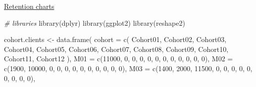 \documentclass[
]{book}
\newenvironment{Shaded}{\begin{snugshade}}{\end{snugshade}}
\newcommand{\AttributeTok}[1]{\textcolor[rgb]{0.77,0.63,0.00}{#1}}
\newcommand{\CommentTok}[1]{\textcolor[rgb]{0.56,0.35,0.01}{\textit{#1}}}
\newcommand{\DecValTok}[1]{\textcolor[rgb]{0.00,0.00,0.81}{#1}}
\newcommand{\FunctionTok}[1]{\textcolor[rgb]{0.00,0.00,0.00}{#1}}
\newcommand{\NormalTok}[1]{#1}
\newcommand{\OtherTok}[1]{\textcolor[rgb]{0.56,0.35,0.01}{#1}}
\newcommand{\StringTok}[1]{\textcolor[rgb]{0.31,0.60,0.02}{#1}}
\begin{document}
\href{https://www.analyzecore.com/2014/07/03/cohort-analysis-in-r-retention-charts/}{Retention charts}

\begin{Shaded}
\begin{Highlighting}[]
\CommentTok{\# libraries}
\FunctionTok{library}\NormalTok{(dplyr)}
\FunctionTok{library}\NormalTok{(ggplot2)}
\FunctionTok{library}\NormalTok{(reshape2)}

\NormalTok{cohort.clients }\OtherTok{\textless{}{-}} \FunctionTok{data.frame}\NormalTok{(}
    \AttributeTok{cohort =} \FunctionTok{c}\NormalTok{(}
        \StringTok{\textquotesingle{}Cohort01\textquotesingle{}}\NormalTok{,}
        \StringTok{\textquotesingle{}Cohort02\textquotesingle{}}\NormalTok{,}
        \StringTok{\textquotesingle{}Cohort03\textquotesingle{}}\NormalTok{,}
        \StringTok{\textquotesingle{}Cohort04\textquotesingle{}}\NormalTok{,}
        \StringTok{\textquotesingle{}Cohort05\textquotesingle{}}\NormalTok{,}
        \StringTok{\textquotesingle{}Cohort06\textquotesingle{}}\NormalTok{,}
        \StringTok{\textquotesingle{}Cohort07\textquotesingle{}}\NormalTok{,}
        \StringTok{\textquotesingle{}Cohort08\textquotesingle{}}\NormalTok{,}
        \StringTok{\textquotesingle{}Cohort09\textquotesingle{}}\NormalTok{,}
        \StringTok{\textquotesingle{}Cohort10\textquotesingle{}}\NormalTok{,}
        \StringTok{\textquotesingle{}Cohort11\textquotesingle{}}\NormalTok{,}
        \StringTok{\textquotesingle{}Cohort12\textquotesingle{}}
\NormalTok{    ),}
    \AttributeTok{M01 =} \FunctionTok{c}\NormalTok{(}\DecValTok{11000}\NormalTok{, }\DecValTok{0}\NormalTok{, }\DecValTok{0}\NormalTok{, }\DecValTok{0}\NormalTok{, }\DecValTok{0}\NormalTok{, }\DecValTok{0}\NormalTok{, }\DecValTok{0}\NormalTok{, }\DecValTok{0}\NormalTok{, }\DecValTok{0}\NormalTok{, }\DecValTok{0}\NormalTok{, }\DecValTok{0}\NormalTok{, }\DecValTok{0}\NormalTok{),}
    \AttributeTok{M02 =} \FunctionTok{c}\NormalTok{(}\DecValTok{1900}\NormalTok{, }\DecValTok{10000}\NormalTok{, }\DecValTok{0}\NormalTok{, }\DecValTok{0}\NormalTok{, }\DecValTok{0}\NormalTok{, }\DecValTok{0}\NormalTok{, }\DecValTok{0}\NormalTok{, }\DecValTok{0}\NormalTok{, }\DecValTok{0}\NormalTok{, }\DecValTok{0}\NormalTok{, }\DecValTok{0}\NormalTok{, }\DecValTok{0}\NormalTok{),}
    \AttributeTok{M03 =} \FunctionTok{c}\NormalTok{(}\DecValTok{1400}\NormalTok{, }\DecValTok{2000}\NormalTok{, }\DecValTok{11500}\NormalTok{, }\DecValTok{0}\NormalTok{, }\DecValTok{0}\NormalTok{, }\DecValTok{0}\NormalTok{, }\DecValTok{0}\NormalTok{, }\DecValTok{0}\NormalTok{, }\DecValTok{0}\NormalTok{, }\DecValTok{0}\NormalTok{, }\DecValTok{0}\NormalTok{, }\DecValTok{0}\NormalTok{),}

\end{Highlighting}
\end{Shaded}
\end{document}
